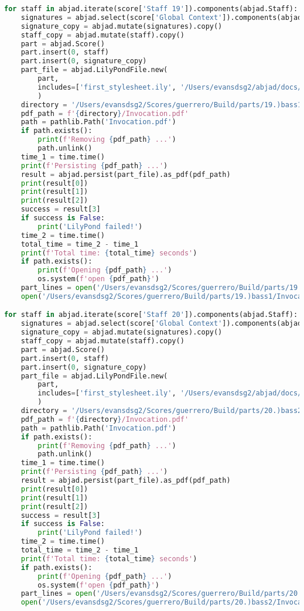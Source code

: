 \begin{lstlisting}[language=Python, caption=Invocation Source Code]
for staff in abjad.iterate(score['Staff 19']).components(abjad.Staff):
    signatures = abjad.select(score['Global Context']).components(abjad.Staff)
    signature_copy = abjad.mutate(signatures).copy()
    staff_copy = abjad.mutate(staff).copy()
    part = abjad.Score()
    part.insert(0, staff)
    part.insert(0, signature_copy)
    part_file = abjad.LilyPondFile.new(
        part,
        includes=['first_stylesheet.ily', '/Users/evansdsg2/abjad/docs/source/_stylesheets/abjad.ily'],
        )
    directory = '/Users/evansdsg2/Scores/guerrero/Build/parts/19.)bass1'
    pdf_path = f'{directory}/Invocation.pdf'
    path = pathlib.Path('Invocation.pdf')
    if path.exists():
        print(f'Removing {pdf_path} ...')
        path.unlink()
    time_1 = time.time()
    print(f'Persisting {pdf_path} ...')
    result = abjad.persist(part_file).as_pdf(pdf_path)
    print(result[0])
    print(result[1])
    print(result[2])
    success = result[3]
    if success is False:
        print('LilyPond failed!')
    time_2 = time.time()
    total_time = time_2 - time_1
    print(f'Total time: {total_time} seconds')
    if path.exists():
        print(f'Opening {pdf_path} ...')
        os.system(f'open {pdf_path}')
    part_lines = open('/Users/evansdsg2/Scores/guerrero/Build/parts/19.)bass1/Invocation.ly').readlines()
    open('/Users/evansdsg2/Scores/guerrero/Build/parts/19.)bass1/Invocation.ly', 'w').writelines(part_lines[15:-1])

for staff in abjad.iterate(score['Staff 20']).components(abjad.Staff):
    signatures = abjad.select(score['Global Context']).components(abjad.Staff)
    signature_copy = abjad.mutate(signatures).copy()
    staff_copy = abjad.mutate(staff).copy()
    part = abjad.Score()
    part.insert(0, staff)
    part.insert(0, signature_copy)
    part_file = abjad.LilyPondFile.new(
        part,
        includes=['first_stylesheet.ily', '/Users/evansdsg2/abjad/docs/source/_stylesheets/abjad.ily'],
        )
    directory = '/Users/evansdsg2/Scores/guerrero/Build/parts/20.)bass2'
    pdf_path = f'{directory}/Invocation.pdf'
    path = pathlib.Path('Invocation.pdf')
    if path.exists():
        print(f'Removing {pdf_path} ...')
        path.unlink()
    time_1 = time.time()
    print(f'Persisting {pdf_path} ...')
    result = abjad.persist(part_file).as_pdf(pdf_path)
    print(result[0])
    print(result[1])
    print(result[2])
    success = result[3]
    if success is False:
        print('LilyPond failed!')
    time_2 = time.time()
    total_time = time_2 - time_1
    print(f'Total time: {total_time} seconds')
    if path.exists():
        print(f'Opening {pdf_path} ...')
        os.system(f'open {pdf_path}')
    part_lines = open('/Users/evansdsg2/Scores/guerrero/Build/parts/20.)bass2/Invocation.ly').readlines()
    open('/Users/evansdsg2/Scores/guerrero/Build/parts/20.)bass2/Invocation.ly', 'w').writelines(part_lines[15:-1])


\end{lstlisting}
